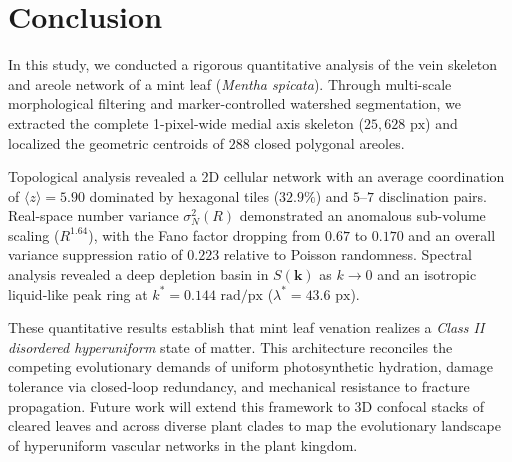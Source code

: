 \documentclass[10pt,twocolumn]{article}
\begin{document}
\section{Conclusion}
In this study, we conducted a rigorous quantitative analysis of the vein skeleton and areole network of a mint leaf (\textit{Mentha spicata}). Through multi-scale morphological filtering and marker-controlled watershed segmentation, we extracted the complete 1-pixel-wide medial axis skeleton ($25,628\text{ px}$) and localized the geometric centroids of $288$ closed polygonal areoles.

Topological analysis revealed a 2D cellular network with an average coordination of $\langle z \rangle = 5.90$ dominated by hexagonal tiles ($32.9\%$) and $5$--$7$ disclination pairs. Real-space number variance $\sigma_N^2(R)$ demonstrated an anomalous sub-volume scaling ($R^{1.64}$), with the Fano factor dropping from $0.67$ to $0.170$ and an overall variance suppression ratio of $0.223$ relative to Poisson randomness. Spectral analysis revealed a deep depletion basin in $S(\mathbf{k})$ as $k \to 0$ and an isotropic liquid-like peak ring at $k^* = 0.144\text{ rad/px}$ ($\lambda^* = 43.6\text{ px}$).

These quantitative results establish that mint leaf venation realizes a \textit{Class II disordered hyperuniform} state of matter. This architecture reconciles the competing evolutionary demands of uniform photosynthetic hydration, damage tolerance via closed-loop redundancy, and mechanical resistance to fracture propagation. Future work will extend this framework to 3D confocal stacks of cleared leaves and across diverse plant clades to map the evolutionary landscape of hyperuniform vascular networks in the plant kingdom.
\end{document}
